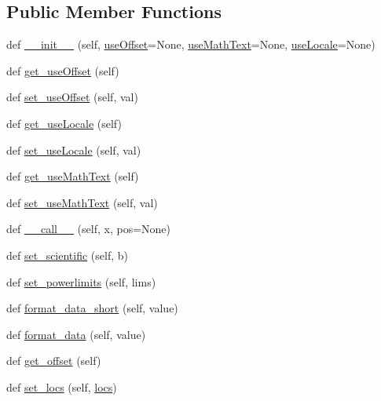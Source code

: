 \subsection*{Public Member Functions}
\begin{DoxyCompactItemize}
\item 
def \hyperlink{classmatplotlib_1_1ticker_1_1ScalarFormatter_ae077d4dee915b7095f71640d45a97473}{\+\_\+\+\_\+init\+\_\+\+\_\+} (self, \hyperlink{classmatplotlib_1_1ticker_1_1ScalarFormatter_a8bb3fb64e3c3fcbd16cf7d224f8345b2}{use\+Offset}=None, \hyperlink{classmatplotlib_1_1ticker_1_1ScalarFormatter_a59e6bbff5de710c66bd601df93f15d6d}{use\+Math\+Text}=None, \hyperlink{classmatplotlib_1_1ticker_1_1ScalarFormatter_a8dd20b19902a213561a9db5e8d95f743}{use\+Locale}=None)
\item 
def \hyperlink{classmatplotlib_1_1ticker_1_1ScalarFormatter_ad888084ada89fd2462e54346988ee0bb}{get\+\_\+use\+Offset} (self)
\item 
def \hyperlink{classmatplotlib_1_1ticker_1_1ScalarFormatter_aec6995dab1fd846023a6c48f88e88f9c}{set\+\_\+use\+Offset} (self, val)
\item 
def \hyperlink{classmatplotlib_1_1ticker_1_1ScalarFormatter_a3d474a0a355cbf753eb9340ae80e4839}{get\+\_\+use\+Locale} (self)
\item 
def \hyperlink{classmatplotlib_1_1ticker_1_1ScalarFormatter_a03dd9ef155683dca654facedea82de00}{set\+\_\+use\+Locale} (self, val)
\item 
def \hyperlink{classmatplotlib_1_1ticker_1_1ScalarFormatter_a1687f734f10eac1abd32d52ef58feadd}{get\+\_\+use\+Math\+Text} (self)
\item 
def \hyperlink{classmatplotlib_1_1ticker_1_1ScalarFormatter_ac3a831d21e643c139e1bbaebb1027eb7}{set\+\_\+use\+Math\+Text} (self, val)
\item 
def \hyperlink{classmatplotlib_1_1ticker_1_1ScalarFormatter_a06e0b0e6bbf0e46f800128aa0ea3b66f}{\+\_\+\+\_\+call\+\_\+\+\_\+} (self, x, pos=None)
\item 
def \hyperlink{classmatplotlib_1_1ticker_1_1ScalarFormatter_a05a1ec2dd82c238190375dd8d2089baf}{set\+\_\+scientific} (self, b)
\item 
def \hyperlink{classmatplotlib_1_1ticker_1_1ScalarFormatter_a0462a97f0a87ed665f690d660654a744}{set\+\_\+powerlimits} (self, lims)
\item 
def \hyperlink{classmatplotlib_1_1ticker_1_1ScalarFormatter_a4ff03b110657d7f259d3329828e15287}{format\+\_\+data\+\_\+short} (self, value)
\item 
def \hyperlink{classmatplotlib_1_1ticker_1_1ScalarFormatter_a2c1be26b7699b42daa16bc684f287f9f}{format\+\_\+data} (self, value)
\item 
def \hyperlink{classmatplotlib_1_1ticker_1_1ScalarFormatter_a74290031efb93f8775255fd3b58f2f2b}{get\+\_\+offset} (self)
\item 
def \hyperlink{classmatplotlib_1_1ticker_1_1ScalarFormatter_aaff41b6bcfcfbd1a3480bb187113ef66}{set\+\_\+locs} (self, \hyperlink{classmatplotlib_1_1ticker_1_1ScalarFormatter_a6d5193479f9fcc90f053999eda81f143}{locs})
\end{DoxyCompactItemize}
